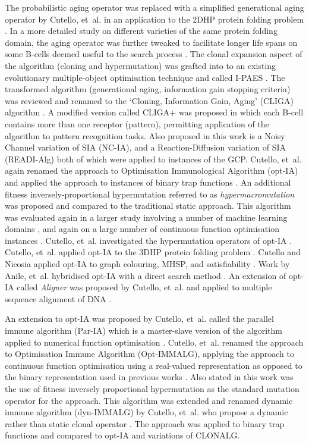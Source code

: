The probabilistic aging operator was replaced with a simplified generational aging operator by Cutello, et~al. in an application to the 2DHP protein folding problem \cite{Cutello2004a}. In a more detailed study on different varieties of the same protein folding domain, the aging operator was further tweaked to facilitate longer life spans on some B-cells deemed useful to the search process \cite{Cutello2006b}. The clonal expansion aspect of the algorithm (cloning and hypermutation) was grafted into to an existing evolutionary multiple-object optimisation technique and called I-PAES \cite{Cutello2006a} . The transformed algorithm (generational aging, information gain stopping criteria) was reviewed and renamed to the `Cloning, Information Gain, Aging' (CLIGA) algorithm \cite{Cutello2005b}. A modified version called CLIGA+ was proposed in which each B-cell contains more than one receptor (pattern), permitting application of the algorithm to pattern recognition tasks. Also proposed in this work is a Noisy Channel variation of SIA (NC-IA), and a Reaction-Diffusion variation of SIA (READI-Alg) both of which were applied to instances of the GCP.  
Cutello, et~al. again renamed the approach to Optimisation Immunological Algorithm (opt-IA) and applied the approach to instances of binary trap functions \cite{Cutello2004}. An additional fitness inversely-proportional hypermutation referred to as \emph{hypermacromutation} was proposed and compared to the traditional static approach. This algorithm was evaluated again in a larger study involving a number of machine learning domains \cite{Cutello2005a}, and again on a large number of continuous function optimisation instances \cite{Cutello2005c}. Cutello, et~al. investigated the hypermutation operators of opt-IA \cite{Cutello2004b}. Cutello, et~al. applied opt-IA to the 3DHP protein folding problem \cite{Cutello2005}. Cutello and Nicosia  applied opt-IA to graph colouring, MHSP, and satisfiability \cite{Cutello2006e}. Work by Anile, et~al. hybridised opt-IA with a direct search method \cite{Anile2006}. An extension of opt-IA called \emph{Aligner} was proposed by Cutello, et~al. and applied to multiple sequence alignment of DNA  \cite{Cutello2006}.

An extension to opt-IA was proposed by Cutello, et~al. called the parallel immune algorithm (Par-IA) which is a master-slave version of the algorithm applied to numerical function optimisation \cite{Cutello2006d}. Cutello, et~al. renamed the approach to Optimisation Immune Algorithm (Opt-IMMALG), applying the approach to continuous function optimisation using a real-valued representation as opposed to the binary representation used in previous works \cite{Cutello2006f}. Also stated in this work was the use of fitness inversely proportional hypermutation as the standard mutation operator for the approach. This algorithm was extended and renamed dynamic immune algorithm (dyn-IMMALG) by Cutello, et~al. who propose a dynamic rather than static clonal operator \cite{Cutello2006c}. The approach was applied to binary trap functions and compared to opt-IA and variations of CLONALG.


